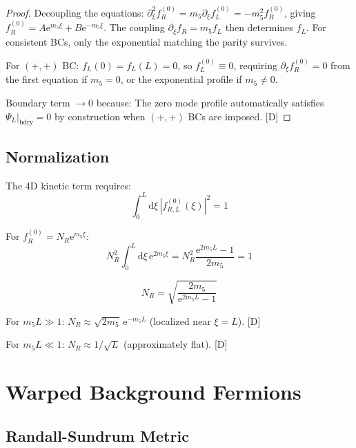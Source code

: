 \documentclass[11pt,a4paper]{article}
\newcommand{\dd}{\mathrm{d}}
\newcommand{\ee}{\mathrm{e}}
\begin{document}
\begin{proof}
Decoupling the equations: $\partial_\xi^2 f_R^{(0)} = m_5 \partial_\xi f_L^{(0)} = -m_5^2 f_R^{(0)}$,
giving $f_R^{(0)} = A\ee^{m_5\xi} + B\ee^{-m_5\xi}$. The coupling $\partial_\xi f_R = m_5 f_L$
then determines $f_L$. For consistent BCs, only the exponential matching the parity survives.

For $(+,+)$ BC: $f_L(0) = f_L(L) = 0$, so $f_L^{(0)} \equiv 0$, requiring $\partial_\xi f_R^{(0)} = 0$
from the first equation if $m_5 = 0$, or the exponential profile if $m_5 \neq 0$.

Boundary term $\to 0$ because: The zero mode profile automatically satisfies $\Psi_L|_{\text{bdry}} = 0$
by construction when $(+,+)$ BCs are imposed. [D]
\end{proof}

\subsection{Normalization}

The 4D kinetic term requires:
\begin{equation}
\int_0^L \dd\xi\, |f_{R,L}^{(0)}(\xi)|^2 = 1
\label{eq:normalization}
\end{equation}

For $f_R^{(0)} = N_R \ee^{m_5 \xi}$:
\begin{equation}
N_R^2 \int_0^L \dd\xi\, \ee^{2m_5 \xi} = N_R^2 \frac{\ee^{2m_5 L} - 1}{2m_5} = 1
\label{eq:norm-integral}
\end{equation}

\begin{equation}
\boxed{
N_R = \sqrt{\frac{2m_5}{\ee^{2m_5 L} - 1}}
}
\label{eq:norm-factor}
\end{equation}

For $m_5 L \gg 1$: $N_R \approx \sqrt{2m_5}\, \ee^{-m_5 L}$ (localized near $\xi = L$). [D]

For $m_5 L \ll 1$: $N_R \approx 1/\sqrt{L}$ (approximately flat). [D]

\section{Warped Background Fermions}
\label{sec:warped-fermion}

\subsection{Randall-Sundrum Metric}
\end{document}
